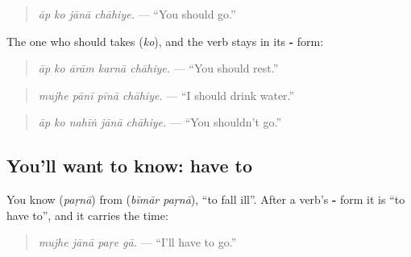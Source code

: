 \begin{quote}
\emph{āp ko jānā chāhiye.} — \textquotedblleft{}You should go.\textquotedblright{}
\end{quote}

The one who should takes \textbf{} (\emph{ko}), and the verb stays in its \textbf{-} form:

\begin{quote}
\textbf{    }
\end{quote}

\begin{quote}
\emph{āp ko ārām karnā chāhiye.} — \textquotedblleft{}You should rest.\textquotedblright{}
\end{quote}

\begin{quote}
\textbf{   }
\end{quote}

\begin{quote}
\emph{mujhe pānī pīnā chāhiye.} — \textquotedblleft{}I should drink water.\textquotedblright{}
\end{quote}

\begin{quote}
\textbf{    }
\end{quote}

\begin{quote}
\emph{āp ko nahīṅ jānā chāhiye.} — \textquotedblleft{}You shouldn't go.\textquotedblright{}
\end{quote}

\subsection*{You'll want to know: have to}
You know \textbf{} (\emph{paṛnā}) from \textbf{ } (\emph{bīmār paṛnā}), \textquotedblleft{}to fall ill\textquotedblright{}. After a verb's \textbf{-} form it is \textquotedblleft{}to have to\textquotedblright{}, and it carries the time:

\begin{quote}
\textbf{   }
\end{quote}

\begin{quote}
\emph{mujhe jānā paṛe gā.} — \textquotedblleft{}I'll have to go.\textquotedblright{}
\end{quote}

